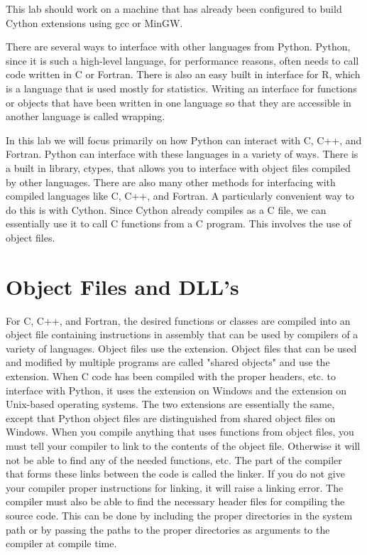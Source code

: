 \label{lab:cythonwrap}


This lab should work on a machine that has already been configured to build Cython extensions using gcc or MinGW.

There are several ways to interface with other languages from Python.
Python, since it is such a high-level language, for performance reasons, often needs to call code written in C or Fortran.
There is also an easy built in interface for R, which is a language that is used mostly for statistics.
Writing an interface for functions or objects that have been written in one language so that they are accessible in another language is called wrapping.

In this lab we will focus primarily on how Python can interact with C, C++, and Fortran.
Python can interface with these languages in a variety of ways.
There is a built in library, ctypes, that allows you to interface with object files compiled by other languages.
There are also many other methods for interfacing with compiled languages like C, C++, and Fortran.
A particularly convenient way to do this is with Cython.
Since Cython already compiles as a C file, we can essentially use it to call C functions from a C program.
This involves the use of object files.

\section*{Object Files and DLL's}

For C, C++, and Fortran, the desired functions or classes are compiled into an object file containing instructions in assembly that can be used by compilers of a variety of languages.
Object files use the  extension.
Object files that can be used and modified by multiple programs are called "shared objects" and use the  extension.
When C code has been compiled with the proper headers, etc. to interface with Python, it uses the  extension on Windows and the  extension on Unix-based operating systems.
The two extensions are essentially the same, except that Python object files are distinguished from shared object files on Windows.
When you compile anything that uses functions from object files, you must tell your compiler to link to the contents of the object file.
Otherwise it will not be able to find any of the needed functions, etc.
The part of the compiler that forms these links between the code is called the linker.
If you do not give your compiler proper instructions for linking, it will raise a linking error.
The compiler must also be able to find the necessary header files for compiling the source code.
This can be done by including the proper directories in the system path or by passing the paths to the proper directories as arguments to the compiler at compile time.

